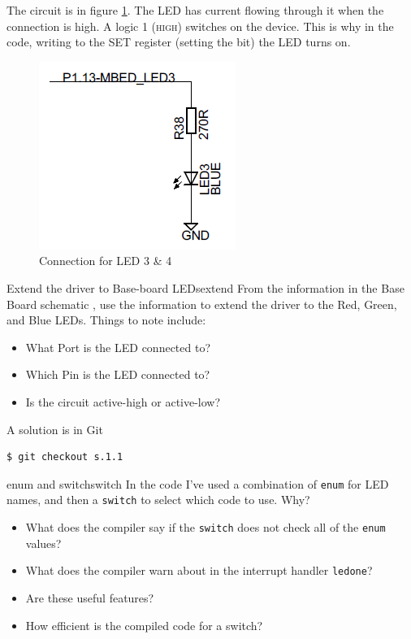 \documentclass[a4paper]{tufte-handout}
\begin{document}
  The circuit
is in figure \ref{fig:led34}.  The LED has current flowing through it
when the connection is high.  A logic 1 (\textsc{high}) switches on
the device.  This is why in the code, writing to the \textsc{SET}
register (setting the bit) the LED turns on.
\begin{figure}
  \includegraphics{led34}
  \caption{Connection for LED 3 \& 4}
  \label{fig:led34}
\end{figure}

\begin{exercise}{Extend the driver to Base-board LEDs}{extend}
From the information in the Base Board schematic \citep{baseboard},
use the information to extend the driver to the Red, Green, and Blue
LEDs.  Things to note include:
\begin{itemize}
\item What Port is the LED connected to?
\item Which Pin is the LED connected to?
\item Is the circuit active-high or active-low?
\end{itemize}
\begin{tcolorbox}[colframe=red!50!black,title=Solution]
A solution is in Git 
\begin{verbatim}
$ git checkout s.1.1
\end{verbatim}
\end{tcolorbox}
\end{exercise}

\begin{question}{enum and switch}{switch}
In the code I've used a combination of \texttt{enum} for LED names,
and then a \texttt{switch} to select which code to use.  Why?
\begin{itemize}
\item What does the compiler say if the \texttt{switch} does not check
  all of the \texttt{enum} values?
\item What does the compiler warn about in the interrupt handler
  \texttt{ledone}?
\item Are these useful features?
\item How efficient is the compiled code for a switch?
\end{itemize}
\end{question}
\end{document}
